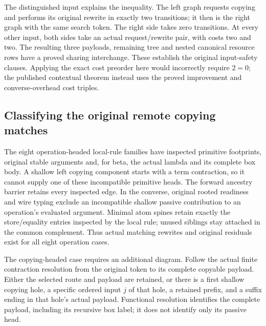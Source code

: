 The distinguished input explains the inequality. The left graph requests
copying and performs its original rewrite in exactly two transitions; it
then is the right graph with the same search token. The right side takes
zero transitions. At every other input, both sides take an actual
request/rewrite pair, with costs two and two. The resulting three payloads,
remaining tree and nested canonical resource rows have a proved sharing
interchange. These establish the original input-safety clauses. Applying
the exact cost preorder here would incorrectly require $2=0$; the published
contextual theorem instead uses the proved improvement and converse-overhead
cost triples.


\par{}
\par{}
\par{}
\par{}

\subsection{Classifying the original remote copying matches}
The eight operation-headed local-rule families have inspected primitive
footprints, original stable arguments and, for beta, the actual lambda and
its complete box body. A shallow left copying component starts with a term
contraction, so it cannot supply one of these incompatible primitive heads.
The forward ancestry barrier retains every inspected edge. In the converse,
original rooted readiness and wire typing exclude an incompatible shallow
passive contribution to an operation's evaluated argument. Minimal atom
spines retain exactly the store/equality entries inspected by the local
rule; unused siblings stay attached in the common complement. Thus actual
matching rewrites and original residuals exist for all eight operation cases.

The copying-headed case requires an additional diagram.
Follow the actual finite contraction resolution from the original token to
its complete copyable payload. Either the selected route and payload are
retained, or there is a first shallow copying hole, a specific ordered input
$j$ of that hole, a retained prefix, and a suffix ending in that hole's actual
payload. Functional resolution identifies the complete payload, including
its recursive box label; it does not identify only its passive head.

